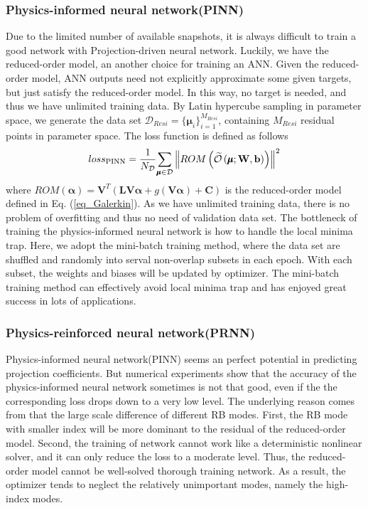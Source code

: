 \documentclass[preprint, 10pt]{elsarticle}
\begin{document}
\subsubsection{Physics-informed neural network(PINN)}
Due to the limited number of available snapshots, it is always difficult to train a good network with Projection-driven neural network. Luckily, we have the reduced-order model, an another choice for training an ANN. Given the reduced-order model, ANN outputs need not explicitly approximate some given targets, but just satisfy the reduced-order model. In this way, no target is needed, and thus we have unlimited training data. By Latin hypercube sampling in parameter space, we generate the data set $\mathcal{D}_{Resi}=\{ \pmb{\mu}_i\}_{i=1}^{M_{Resi}}$, containing $M_{Resi}$ residual points in parameter space. The loss function is defined as follows
\begin{equation}
{loss}_{\rm{PINN}} = \frac{1}{N_{\cal D}}
{{\sum\limits_{\pmb\mu  \in {\cal D}}
{ \left\|
ROM \left(\widetilde {\cal O}\left( {\pmb\mu ;{\bf{W}},{\bf{b}}} \right) \right)
\right \|^2}
}}
\end{equation}
where $ROM(\pmb{\alpha})=\mathbf{V}^T
\left(
 \mathbf{L} \mathbf{V} \pmb{\alpha}
+ g         \left( \mathbf{V} \pmb{\alpha} \right)
+\mathbf{C}
\right)$
is the reduced-order model defined in Eq. (\ref{eq_Galerkin}).
As we have unlimited training data, there is no problem of overfitting and thus no need of validation data set.  The bottleneck of training the physics-informed neural network is how to handle the local minima trap. Here, we adopt the mini-batch training method, where the data set are shuffled and randomly into serval non-overlap subsets in each epoch. With each subset, the weights and biases will be updated by optimizer. The mini-batch training method can effectively avoid local minima trap and has enjoyed great success in lots of applications.

\subsubsection{Physics-reinforced neural network(PRNN)}
\label{PRNN}
Physics-informed neural network(PINN) seems an perfect potential in predicting projection coefficients. But numerical experiments show that  the accuracy of the physics-informed neural network sometimes is not that good, even if the the corresponding loss drops down to a very low level. The underlying reason comes from that the large scale difference of different RB modes.
First, the RB mode with smaller index will be more dominant to the residual of the reduced-order model. Second, the training of network cannot work like a deterministic nonlinear solver, and it can only reduce the loss to a moderate level. Thus, the reduced-order model cannot be well-solved thorough training network. As a result, the optimizer tends to neglect the relatively unimportant modes, namely the high-index modes.
\end{document}
